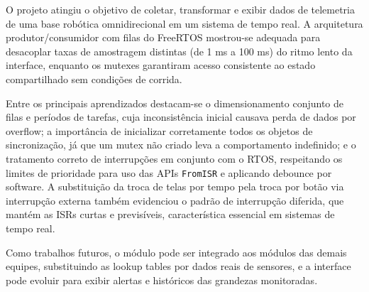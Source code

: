 \documentclass[a4paper,10pt]{article}
\begin{document}
O projeto atingiu o objetivo de coletar, transformar e exibir dados de telemetria de uma base robótica omnidirecional em um sistema de tempo real. A arquitetura produtor/consumidor com filas do FreeRTOS mostrou-se adequada para desacoplar taxas de amostragem distintas (de 1 ms a 100 ms) do ritmo lento da interface, enquanto os mutexes garantiram acesso consistente ao estado compartilhado sem condições de corrida.

Entre os principais aprendizados destacam-se o dimensionamento conjunto de filas e períodos de tarefas, cuja inconsistência inicial causava perda de dados por overflow; a importância de inicializar corretamente todos os objetos de sincronização, já que um mutex não criado leva a comportamento indefinido; e o tratamento correto de interrupções em conjunto com o RTOS, respeitando os limites de prioridade para uso das APIs \texttt{FromISR} e aplicando debounce por software. A substituição da troca de telas por tempo pela troca por botão via interrupção externa também evidenciou o padrão de interrupção diferida, que mantém as ISRs curtas e previsíveis, característica essencial em sistemas de tempo real.

Como trabalhos futuros, o módulo pode ser integrado aos módulos das demais equipes, substituindo as lookup tables por dados reais de sensores, e a interface pode evoluir para exibir alertas e históricos das grandezas monitoradas.

\clearpage
\end{document}
